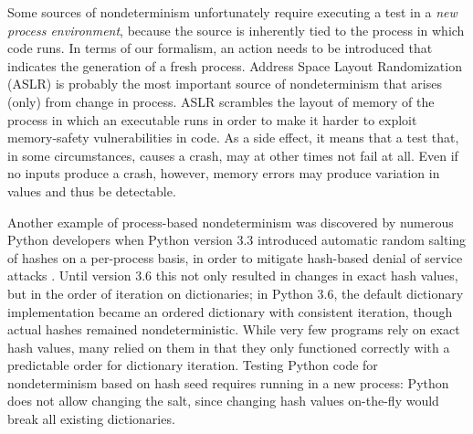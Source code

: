 \label{sec:pnondet}

Some sources of nondeterminism unfortunately require executing a test in a \emph{new
process environment}, because the source is inherently tied to the
process in which code runs.  In terms of our formalism, an
action needs to be introduced that indicates the generation of a fresh
process.  Address Space Layout Randomization (ASLR) \cite{ASLR}  is probably the most
important source of nondeterminism that arises (only) from change in
process.  ASLR scrambles the layout of memory of the process in which
an executable runs in order to make it harder to exploit memory-safety
vulnerabilities in code.  As a side effect, it
means that a test that, in some circumstances, causes a crash, may at
other times not fail at all.  Even if no inputs produce a crash,
however, memory errors may produce variation in values and thus be detectable.

Another example of process-based nondeterminism was discovered by numerous Python developers when Python
version 3.3 introduced automatic random salting of hashes on a
per-process basis,
in order to mitigate hash-based denial of service attacks
\cite{denial}.  Until version 3.6 this not only resulted in changes in
exact hash values, but in the order of iteration on
dictionaries; in Python 3.6, the default dictionary implementation became an ordered dictionary with consistent iteration, though actual hashes remained nondeterministic.  While very few programs rely on exact hash values, many
relied on them in that they only functioned correctly with a
predictable order for dictionary iteration.  Testing
Python code for nondeterminism based on hash seed requires
running in a new process:  Python does not allow changing the salt, since changing hash values on-the-fly would
break all existing dictionaries.



